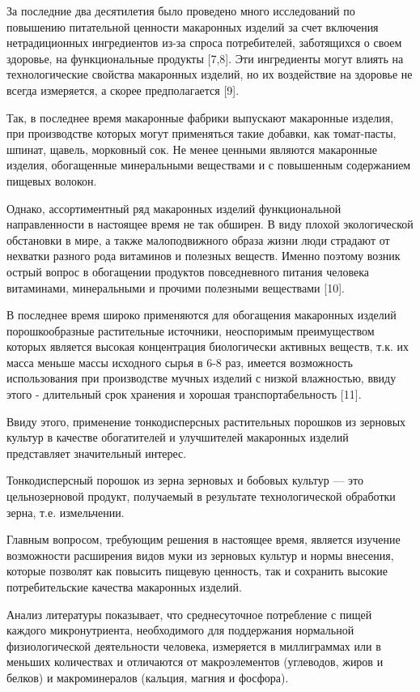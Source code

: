 \begin{multicols}{2}
За последние два десятилетия было проведено много исследований по
повышению питательной ценности макаронных изделий за счет включения
нетрадиционных ингредиентов из-за спроса потребителей, заботящихся о
своем здоровье, на функциональные продукты {[}7,8{]}. Эти ингредиенты
могут влиять на технологические свойства макаронных изделий, но их
воздействие на здоровье не всегда измеряется, а скорее предполагается
{[}9{]}.

Так, в последнее время макаронные фабрики выпускают макаронные изделия,
при производстве которых могут применяться такие добавки, как
томат-пасты, шпинат, щавель, морковный сок. Не менее ценными являются
макаронные изделия, обогащенные минеральными веществами и с повышенным
содержанием пищевых волокон.

Однако, ассортиментный ряд макаронных изделий функциональной
направленности в настоящее время не так обширен. В виду плохой
экологической обстановки в мире, а также малоподвижного образа жизни
люди страдают от нехватки разного рода витаминов и полезных веществ.
Именно поэтому возник острый вопрос в обогащении продуктов повседневного
питания человека витаминами, минеральными и прочими полезными веществами
{[}10{]}.

В последнее время широко применяются для обогащения макаронных изделий
порошкообразные растительные источники, неоспоримым преимуществом
которых является высокая концентрация биологически активных веществ,
т.к. их масса меньше массы исходного сырья в 6-8 раз, имеется
возможность использования при производстве мучных изделий с низкой
влажностью, ввиду этого - длительный срок хранения и хорошая
транспортабельность {[}11{]}.

Ввиду этого, применение тонкодисперсных растительных порошков из
зерновых культур в качестве обогатителей и улучшителей макаронных
изделий представляет значительный интерес.

Тонкодисперсный порошок из зерна зерновых и бобовых культур --- это
цельнозерновой продукт, получаемый в результате технологической
обработки зерна, т.е. измельчении.

Главным вопросом, требующим решения в настоящее время, является изучение
возможности расширения видов муки из зерновых культур и нормы внесения,
которые позволят как повысить пищевую ценность, так и сохранить высокие
потребительские качества макаронных изделий.

Анализ литературы показывает, что среднесуточное потребление с пищей
каждого микронутриента, необходимого для поддержания нормальной
физиологической деятельности человека, измеряется в миллиграммах или в
меньших количествах и отличаются от макроэлементов (углеводов, жиров и
белков) и макроминералов (кальция, магния и фосфора).


\end{multicols}
